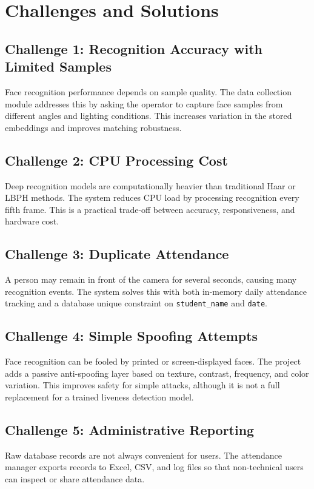 \documentclass[12pt,a4paper]{report}
\newcommand{\JustifiedNormal}{\fontsize{12}{14}\selectfont\justifying\setlength{\parindent}{0pt}}
\begin{document}
\section{Challenges and Solutions}
\JustifiedNormal
\subsection{Challenge 1: Recognition Accuracy with Limited Samples}
\JustifiedNormal
Face recognition performance depends on sample quality. The data collection module addresses this by asking the operator to capture face samples from different angles and lighting conditions. This increases variation in the stored embeddings and improves matching robustness.

\subsection{Challenge 2: CPU Processing Cost}
\JustifiedNormal
Deep recognition models are computationally heavier than traditional Haar or LBPH methods. The system reduces CPU load by processing recognition every fifth frame. This is a practical trade-off between accuracy, responsiveness, and hardware cost.

\subsection{Challenge 3: Duplicate Attendance}
\JustifiedNormal
A person may remain in front of the camera for several seconds, causing many recognition events. The system solves this with both in-memory daily attendance tracking and a database unique constraint on \texttt{student\_name} and \texttt{date}.

\subsection{Challenge 4: Simple Spoofing Attempts}
\JustifiedNormal
Face recognition can be fooled by printed or screen-displayed faces. The project adds a passive anti-spoofing layer based on texture, contrast, frequency, and color variation. This improves safety for simple attacks, although it is not a full replacement for a trained liveness detection model.

\subsection{Challenge 5: Administrative Reporting}
\JustifiedNormal
Raw database records are not always convenient for users. The attendance manager exports records to Excel, CSV, and log files so that non-technical users can inspect or share attendance data.
\end{document}
